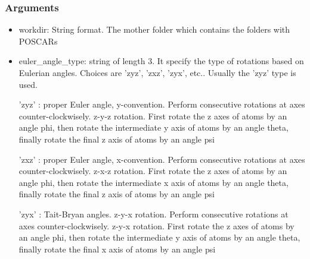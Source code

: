\documentclass[12pt]{book}
\begin{document}
\subsubsection{Arguments}

\begin{itemize}
\item workdir: String format. The mother folder which contains the folders with POSCARs
\item euler\_angle\_type: string of length 3. It specify the type of rotations based on Eulerian angles. Choices are 'zyz', 'zxz', 'zyx', etc.. Usually the 'zyz' type is used.

            'zyz' : proper Euler angle, y-convention. Perform consecutive rotations at axes counter-clockwisely. z-y-z rotation.
                    First rotate the z axes of atoms by an angle phi, then rotate the intermediate y axis of atoms by an angle theta, finally rotate the final z axis of atoms by an angle psi

            'zxz' : proper Euler angle, x-convention. Perform consecutive rotations at axes counter-clockwisely. z-x-z rotation.
                    First rotate the z axes of atoms by an angle phi, then rotate the intermediate x axis of atoms by an angle theta, finally rotate the final z axis of atoms by an angle psi

            'zyx' : Tait-Bryan angles. z-y-x rotation. Perform consecutive rotations at axes counter-clockwisely. z-y-x rotation.
                    First rotate the z axes of atoms by an angle phi, then rotate the intermediate y axis of atoms by an angle theta, finally rotate the final x axis of atoms by an angle psi


\end{itemize}
\end{document}
